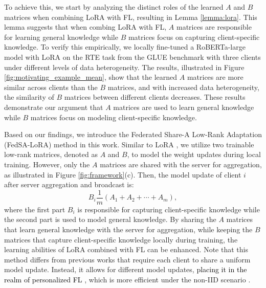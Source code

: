 \documentclass{article} %
\newcommand{\pengxin}[1]{\textcolor{black}{#1}}
\begin{document}
To achieve this, we start by analyzing the distinct roles of the learned $A$ and $B$ matrices when combining LoRA with FL, resulting in Lemma \ref{lemma:lora}. This lemma suggests that when combing LoRA with FL, $A$ matrices are responsible for learning general knowledge while $B$ matrices focus on capturing client-specific knowledge. To verify this empirically, we locally fine-tuned a RoBERTa-large model \citep{liu2019roberta} with LoRA \citep{hulora} on the RTE task from the GLUE benchmark \citep{wang2018glue} with three clients under different levels of data heterogeneity. The results, illustrated in Figure \ref{fig:motivating_example_mean}, show that the learned $A$ matrices are more similar across clients than the $B$ matrices, and with increased data heterogeneity, the similarity of $B$ matrices between different clients decreases. These results demonstrate our argument that $A$ matrices are used to learn general knowledge while $B$ matrices focus on modeling client-specific knowledge.

Based on our findings, we introduce the Federated Share-A Low-Rank Adaptation (FedSA-LoRA) method in this work. Similar to LoRA \citep{hulora}, we utilize two trainable low-rank matrices, denoted as $A$ and $B$, to model the weight updates during local training. However, only the $A$ matrices are shared with the server for aggregation, as illustrated in Figure \ref{fig:framework}(c). Then, the model update of client $i$ after server aggregation and broadcast is:
\begin{equation} \label{eq:fedsa_lora}
B_i\frac{1}{m}(A_1 + A_2 + \cdots + A_m),
\end{equation}
where the first part $B_i$ is responsible for capturing client-specific knowledge while the second part is used to model general knowledge. By sharing the $A$ matrices that learn general knowledge with the server for aggregation, while keeping the $B$ matrices that capture client-specific knowledge locally during training, the learning abilities of LoRA combined with FL can be enhanced. Note that this method differs from previous works \citep{sunimproving,wang2024flora} that require each client to share a uniform model update. Instead, it allows for different model updates, \pengxin{placing it in the realm of personalized FL \citep{t2020personalized,collins2021exploiting,xu2023personalized}}, which is more efficient under the non-IID scenario \citep{zhao2018federated,zhu2021federated,li2022federated}.
\end{document}
